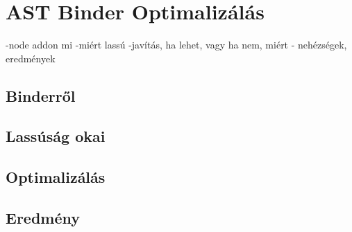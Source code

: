 \chapter{AST Binder Optimalizálás}\label{chap:AST Binder Optimalizálás}
-node addon mi
-miért lassú
-javítás, ha lehet, vagy ha nem, miért
- nehézségek, eredmények 


\section{Binderről}

\section{Lassúság okai}

\section{Optimalizálás}

\section{Eredmény}

